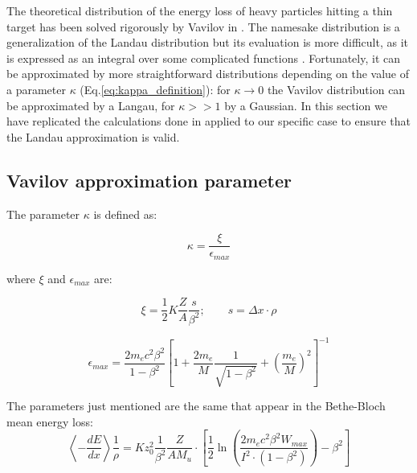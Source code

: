 The theoretical distribution of the energy loss of heavy particles hitting a thin target has been solved rigorously by Vavilov in \cite{vavilov_1957}. The namesake distribution is a generalization of the Landau distribution but its evaluation is more difficult, as it is expressed as an integral over some complicated functions \cite[Eq.(4)]{vavilov_1957}. Fortunately, it can be approximated by more straightforward distributions depending on the value of a parameter $\kappa$ (Eq.\eqref{eq:kappa_definition}): for $\kappa\rightarrow0$ the Vavilov distribution can be approximated by a Langau, for $\kappa>>1$ by a Gaussian. 
In this section we have replicated the calculations done in \cite{NAP20066} applied to our specific case to ensure that the Landau approximation is valid.

\subsection{Vavilov approximation parameter} %

The parameter \(\kappa\) is defined as:

\begin{equation}\label{eq:kappa_definition}
    \kappa = \frac{\xi}{\epsilon_{max}}
\end{equation}

where $\xi$ and $\epsilon_{max}$ \cite[Eq.(1)]{NAP20066} are:

\begin{equation*}
    \xi = \frac{1}{2} K \frac{Z}{A} \frac{s} {\beta^2}; \qquad s = \Delta x \cdot \rho
\end{equation*}

\begin{equation*}
\epsilon_{max} = \frac{2m_e c^2 \beta^2}{1-\beta^2}\left[ 1 + \frac{2m_e}{M}\frac{1}{\sqrt{1-\beta^2}} + \left(\frac{m_e}{M}\right)^2 \right]^{-1}
\end{equation*}


The parameters just mentioned are the same that appear in the Bethe-Bloch mean energy loss:
\begin{equation*}
    \left\langle-\frac{dE}{dx} \right\rangle \frac{1}{\rho} =  K z_0^2 \frac{1}{\beta^2} \frac{Z}{A M_u} \cdot\left[\frac{1}{2}\ln \left(\frac{2m_e c^2 \beta^2 W_{max}}{I^2 \cdot (1-\beta^2)}\right) - \beta^2\right]
\end{equation*}

